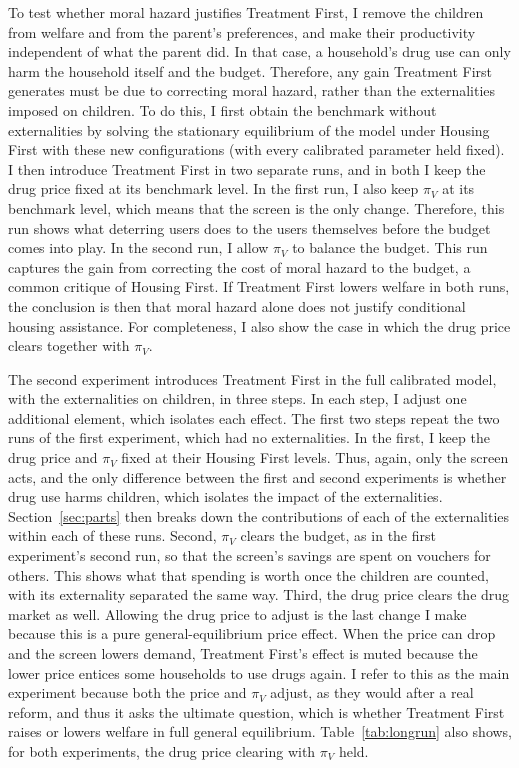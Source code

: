 \documentclass[10pt]{article}
\begin{document}
To test whether moral hazard justifies Treatment First, I remove the children from welfare and from the parent's preferences, and make their productivity independent of what the parent did.   In that case, a household's drug use can only harm the household itself and the budget. Therefore, any gain Treatment First generates must be due to correcting moral hazard, rather than the externalities imposed on children. To do this, I first obtain the benchmark without externalities by solving the stationary equilibrium of the model under Housing First with these new configurations (with every calibrated parameter held fixed). I then introduce Treatment First in two separate runs, and in both I keep the drug price fixed at its benchmark level. In the first run, I also keep $\pi_V$ at its benchmark level, which means that the screen is the only change. Therefore, this run shows what deterring users does to the users themselves before the budget comes into play. In the second run, I allow $\pi_V$ to balance the budget. This run captures the gain from correcting the cost of moral hazard to the budget, a common critique of Housing First. If Treatment First lowers welfare in both runs, the conclusion is then that moral hazard alone does not justify conditional housing assistance. For completeness, I also show the case in which the drug price clears together with $\pi_V$.

The second experiment introduces Treatment First in the full calibrated model, with the externalities on children, in three steps.   In each step, I adjust one additional element, which isolates each effect. The first two steps repeat the two runs of the first experiment, which had no externalities. In the first, I keep the drug price and $\pi_V$ fixed at their Housing First levels. Thus, again, only the screen acts, and the only difference between the first and second experiments is whether drug use harms children, which isolates the impact of the externalities. Section~\ref{sec:parts} then breaks down the contributions of each of the externalities within each of these runs. Second, $\pi_V$ clears the budget, as in the first experiment's second run, so that the screen's savings are spent on vouchers for others. This shows what that spending is worth once the children are counted, with its externality separated the same way. Third, the drug price clears the drug market as well.   Allowing the drug price to adjust is the last change I make because this is a pure general-equilibrium price effect. When the price can drop and the screen lowers demand, Treatment First's effect is muted because the lower price entices some households to use drugs again. I refer to this as the main experiment because both the price and $\pi_V$ adjust, as they would after a real reform, and thus it asks the ultimate question, which is whether Treatment First raises or lowers welfare in full general equilibrium. Table~\ref{tab:longrun} also shows, for both experiments, the drug price clearing with $\pi_V$ held.
\end{document}
